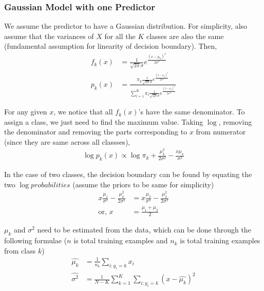 \documentclass[11pt, a4paper]{article}
\begin{document}
    \subsubsection{Gaussian Model with one Predictor}
    We assume the predictor to have a Gaussian distribution. For simplicity, also assume that the variances of $X$ for all the $K$ classes are also the same (fundamental assumption for linearity of decision boundary). Then,
    \begin{align*}
        f_{k}(x) &= \frac{1}{\sqrt{2\pi}\sigma}e^{\frac{(x-\mu_{k})^{2}}{2\sigma^{2}}}\\
        p_{k}(x) &= \frac{\pi_{k}\frac{1}{\sqrt{2\pi}\sigma}e^{\frac{(x-\mu_{k})^{2}}{2\sigma^{2}}}}{\sum_{l=1}^{K}\pi_{l}\frac{1}{\sqrt{2\pi}\sigma}e^{\frac{(x-\mu_{l})^{2}}{2\sigma^{2}}}}
    \end{align*}
    
    For any given $x$, we notice that all $f_{k}(x)$'s have the same denominator. To assign a class, we just need to find the maximum value. Taking $\log$, removing the denominator and removing the parts corresponding to $x$ from numerator (since they are same across all classses),
    \begin{align*}
        \log{p_{k}(x)} \propto \log{\pi_{k}} + \frac{\mu_{k}^{2}}{2\sigma^{2}} - \frac{x\mu_{k}}{\sigma^{2}}
    \end{align*}

    In the case of two classes, the decision boundary can be found by equating the two $\log probabilities$ (assume the priors to be same for simplicity)
    \begin{align*}
        x\frac{\mu_{1}}{\sigma^{2}} - \frac{\mu_{k}^{2}}{2\sigma^{2}} &= x\frac{\mu_{2}}{\sigma^{2}} - \frac{\mu_{2}^{2}}{2\sigma^{2}} \\
        \text{or, } x &= \frac{\mu_{1} + \mu_{2}}{2} 
    \end{align*}

    $\mu_{k}$ and $\sigma^{2}$ need to be estimated from the data, which can be done through the following formulae ($n$ is total training examples and $n_{k}$ is total training examples from class $k$)
    \begin{align*}
        \hat{\mu_{k}} &= \frac{1}{n_{k}} \sum_{i:y_{i}=k}x_{i}\\
        \hat{\sigma^{2}} &= \frac{1}{N - K}\sum_{k=1}^{K}\sum_{i:y_{i}=k}(x-\hat{\mu_{k}})^{2}
    \end{align*}
\end{document}
